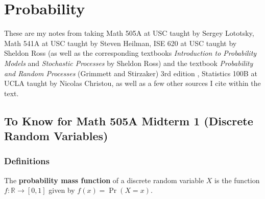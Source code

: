 %
%
%
%
%
%
%
%
%
%
%
%

\section{Probability}

These are my notes from taking Math 505A at USC taught by Sergey Lototsky, Math 541A at USC taught by Steven Heilman, ISE 620 at USC taught by Sheldon Ross (as well as the corresponding textbooks \textit{Introduction to Probability Models} \citep{2014i} and \textit{Stochastic Processes} \citep{ross2008stochastic} by Sheldon Ross) and the textbook \textit{Probability and Random Processes} (Grimmett and Stirzaker) 3rd edition \citep{grimmett2001probability}, Statistics 100B at UCLA taught by Nicolas Christou, as well as a few other sources I cite within the text.

\subsection{To Know for Math 505A Midterm 1 (Discrete Random Variables)}

\subsubsection{Definitions}

\begin{definition}The \textbf{probability mass function} of a discrete random variable \(X\) is the function \(f: \mathbb{R} \to [0,1]\) given by \(f(x) = \Pr(X = x)\). \end{definition}

